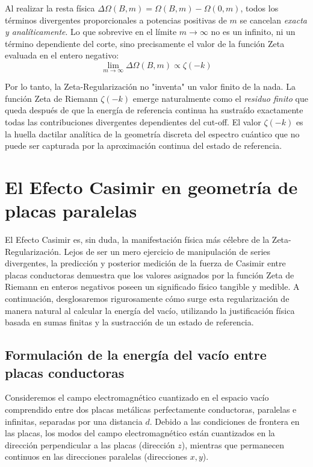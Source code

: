 Al realizar la resta física $\Delta \Omega(B, m) = \Omega(B, m) - \Omega(0, m)$, todos los términos divergentes proporcionales a potencias positivas de $m$ se cancelan \textit{exacta y analíticamente}. Lo que sobrevive en el límite $m \to \infty$ no es un infinito, ni un término dependiente del corte, sino precisamente el valor de la función Zeta evaluada en el entero negativo:
$$ \lim_{m \to \infty} \Delta \Omega(B, m) \propto \zeta(-k) $$

Por lo tanto, la Zeta-Regularización no "inventa" un valor finito de la nada. La función Zeta de Riemann $\zeta(-k)$ emerge naturalmente como el \textit{residuo finito} que queda después de que la energía de referencia continua ha sustraído exactamente todas las contribuciones divergentes dependientes del cut-off. El valor $\zeta(-k)$ es la huella dactilar analítica de la geometría discreta del espectro cuántico que no puede ser capturada por la aproximación continua del estado de referencia.

\section{El Efecto Casimir en geometría de placas paralelas}

El Efecto Casimir es, sin duda, la manifestación física más célebre de la Zeta-Regularización. Lejos de ser un mero ejercicio de manipulación de series divergentes, la predicción y posterior medición de la fuerza de Casimir entre placas conductoras demuestra que los valores asignados por la función Zeta de Riemann en enteros negativos poseen un significado físico tangible y medible. A continuación, desglosaremos rigurosamente cómo surge esta regularización de manera natural al calcular la energía del vacío, utilizando la justificación física basada en sumas finitas y la sustracción de un estado de referencia.

\subsection{Formulación de la energía del vacío entre placas conductoras}

Consideremos el campo electromagnético cuantizado en el espacio vacío comprendido entre dos placas metálicas perfectamente conductoras, paralelas e infinitas, separadas por una distancia $d$. Debido a las condiciones de frontera en las placas, los modos del campo electromagnético están cuantizados en la dirección perpendicular a las placas (dirección $z$), mientras que permanecen continuos en las direcciones paralelas (direcciones $x, y$). 

